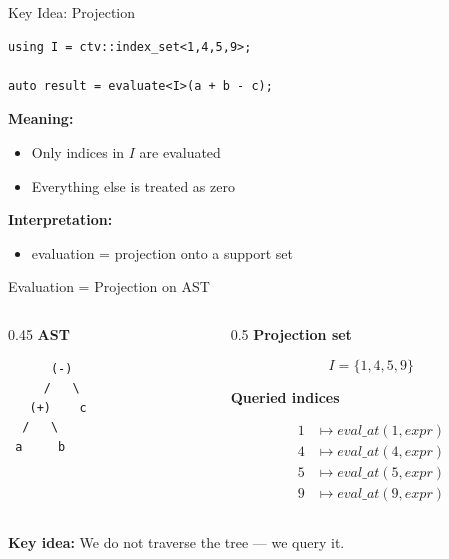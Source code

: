 \documentclass{beamer}
\begin{document}
\begin{frame}[fragile]{Key Idea: Projection}
\begin{lstlisting}
using I = ctv::index_set<1,4,5,9>;

auto result = evaluate<I>(a + b - c);
\end{lstlisting}

\vspace{1em}

\textbf{Meaning:}

\begin{itemize}
\item Only indices in $I$ are evaluated
\item Everything else is treated as zero
\end{itemize}

\vspace{1em}

\textbf{Interpretation:}
\begin{itemize}
\item evaluation = projection onto a support set
\end{itemize}

\end{frame}


\begin{frame}[fragile]{Evaluation = Projection on AST}
\begin{columns}[T]
\begin{column}{0.45\textwidth}
\textbf{AST}

\begin{verbatim}
      (-)
     /   \
   (+)    c
  /   \
 a     b
\end{verbatim}
\end{column}

\begin{column}{0.5\textwidth}
\textbf{Projection set}

\[
I = \{1,4,5,9\}
\]

\vspace{0.5em}

\textbf{Queried indices}

\[
\begin{aligned}
1 &\mapsto eval\_at(1, expr) \\
4 &\mapsto eval\_at(4, expr) \\
5 &\mapsto eval\_at(5, expr) \\
9 &\mapsto eval\_at(9, expr)
\end{aligned}
\]
\end{column}
\end{columns}

\vspace{0.8em}

\textbf{Key idea:} We do not traverse the tree --- we query it.

\end{frame}
\end{document}
